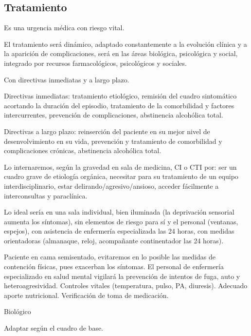 \subsection*{Tratamiento}
Es una urgencia médica con riesgo vital.

El tratamiento será dinámico, adaptado constantemente a la evolución clínica y a la aparición de complicaciones, será en las áreas biológica, psicológica y social, integrado por recursos farmacológicos, psicológicos y sociales.

Con directivas inmediatas y a largo plazo.

Directivas inmediatas: tratamiento etiológico, remisión del cuadro sintomático acortando la duración del episodio, tratamiento de la comorbilidad y factores intercurrentes, prevención de complicaciones, abstinencia alcohólica total.

Directivas a largo plazo: reinserción del paciente en su mejor nivel de desenvolvimiento en su vida, prevención y tratamiento de comorbilidad y complicaciones crónicas, abstinencia alcohólica total.

Lo internaremos, según la gravedad en sala de medicina, CI o CTI por: ser un cuadro grave de etiología orgánica, necesitar para su tratamiento de un equipo interdisciplinario, estar delirando/agresivo/ansioso, acceder fácilmente a interconsultas y paraclínica.

Lo ideal sería en una sala individual, bien iluminada (la deprivación sensorial aumenta los síntomas), sin elementos de riesgo para sí y el personal (ventanas, espejos), con asistencia de enfermería especializada las 24 horas, con medidas orientadoras (almanaque, reloj, acompañante continentador las 24 horas).

Paciente en cama semisentado, evitaremos en lo posible las medidas de contención físicas, pues exacerban los síntomas. El personal de enfermería especializado en salud mental vigilará la prevención de intentos de fuga, auto y heteroagresividad. Controles vitales (temperatura, pulso, PA, diuresis). Adecuado aporte nutricional. Verificación de toma de medicación.

Biológico

Adaptar según el cuadro de base.
\printbibliography